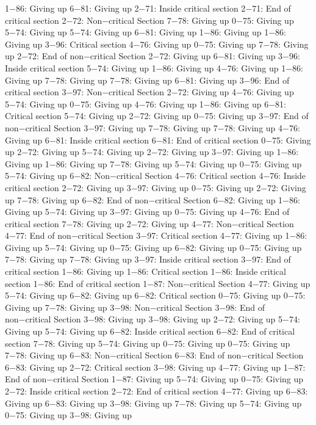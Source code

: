 1−86: Giving up
6−81: Giving up
2−71: Inside critical section
2−71: End of critical section
2−72: Non−critical Section
7−78: Giving up
0−75: Giving up
5−74: Giving up
5−74: Giving up
6−81: Giving up
1−86: Giving up
1−86: Giving up
3−96: Critical section
4−76: Giving up
0−75: Giving up
7−78: Giving up
2−72: End of non−critical Section
2−72: Giving up
6−81: Giving up
3−96: Inside critical section
5−74: Giving up
1−86: Giving up
4−76: Giving up
1−86: Giving up
7−78: Giving up
7−78: Giving up
6−81: Giving up
3−96: End of critical section
3−97: Non−critical Section
2−72: Giving up
4−76: Giving up
5−74: Giving up
0−75: Giving up
4−76: Giving up
1−86: Giving up
6−81: Critical section
5−74: Giving up
2−72: Giving up
0−75: Giving up
3−97: End of non−critical Section
3−97: Giving up
7−78: Giving up
7−78: Giving up
4−76: Giving up
6−81: Inside critical section
6−81: End of critical section
0−75: Giving up
2−72: Giving up
5−74: Giving up
2−72: Giving up
3−97: Giving up
1−86: Giving up
1−86: Giving up
7−78: Giving up
5−74: Giving up
0−75: Giving up
5−74: Giving up
6−82: Non−critical Section
4−76: Critical section
4−76: Inside critical section
2−72: Giving up
3−97: Giving up
0−75: Giving up
2−72: Giving up
7−78: Giving up
6−82: End of non−critical Section
6−82: Giving up
1−86: Giving up
5−74: Giving up
3−97: Giving up
0−75: Giving up
4−76: End of critical section
7−78: Giving up
2−72: Giving up
4−77: Non−critical Section
4−77: End of non−critical Section
3−97: Critical section
4−77: Giving up
1−86: Giving up
5−74: Giving up
0−75: Giving up
6−82: Giving up
0−75: Giving up
7−78: Giving up
7−78: Giving up
3−97: Inside critical section
3−97: End of critical section
1−86: Giving up
1−86: Critical section
1−86: Inside critical section
1−86: End of critical section
1−87: Non−critical Section
4−77: Giving up
5−74: Giving up
6−82: Giving up
6−82: Critical section
0−75: Giving up
0−75: Giving up
7−78: Giving up
3−98: Non−critical Section
3−98: End of non−critical Section
3−98: Giving up
3−98: Giving up
2−72: Giving up
5−74: Giving up
5−74: Giving up
6−82: Inside critical section
6−82: End of critical section
7−78: Giving up
5−74: Giving up
0−75: Giving up
0−75: Giving up
7−78: Giving up
6−83: Non−critical Section
6−83: End of non−critical Section
6−83: Giving up
2−72: Critical section
3−98: Giving up
4−77: Giving up
1−87: End of non−critical Section
1−87: Giving up
5−74: Giving up
0−75: Giving up
2−72: Inside critical section
2−72: End of critical section
4−77: Giving up
6−83: Giving up
6−83: Giving up
3−98: Giving up
7−78: Giving up
5−74: Giving up
0−75: Giving up
3−98: Giving up
